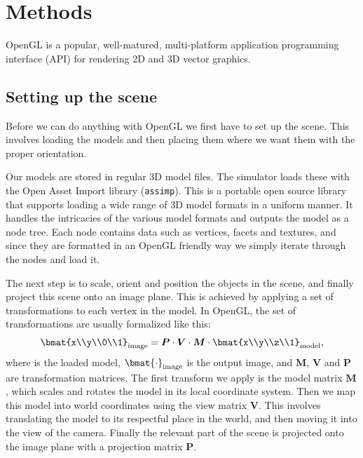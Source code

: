\documentclass[
   UAM                                          %
 , 12pt                                         %
 , bibtex                                       %
 , layout
]{common/mytemplate}
\newcommand\mat[1]{\boldsymbol{#1}}
\renewcommand*\P{\mat P}
\newcommand*\V{\mat V}
\newcommand*\M{\mat M}
\begin{document}
\section{Methods}


OpenGL is a popular, well-matured, multi-platform application programming interface (API) for rendering 2D and 3D vector graphics. 

\subsection{Setting up the scene}

Before we can do anything with OpenGL we first have to set up the scene. This involves loading the models and then placing them where we want them with the proper orientation. 

Our models are stored in regular 3D model files. The simulator loads these with the Open Asset Import library (\texttt{assimp}). This is a portable open source library that supports loading a wide range of 3D model formats in a uniform manner. It handles the intricacies of the various model formats and outputs the model as a node tree. Each node contains data such as vertices, facets and textures, and since they are formatted in an OpenGL friendly way we simply iterate through the nodes and load it.

The next step is to scale, orient and position the objects in the scene, and finally project this scene onto an image plane. This is achieved by applying a set of transformations to each vertex in the model. In OpenGL, the set of transformations are usually formalized like this:
\begin{align*}
\bmat{x\\y\\0\\1}_\text{image} = \P \cdot \V \cdot \M \cdot \bmat{x\\y\\z\\1}_\text{model},
\end{align*}
where is the loaded model, $\bmat{\cdot}_\text{image}$ is the output image, and $\M$, $\V$ and $\P$ are transformation matrices. The first transform we apply is the model matrix $\M$, which scales and rotates the model in its local coordinate system. Then we map this model into world coordinates using the view matrix $\V$. This involves translating the model to its respectful place in the world, and then moving it into the view of the camera. Finally the relevant part of the scene is projected onto the image plane with a projection matrix $\P$. 
\end{document}
